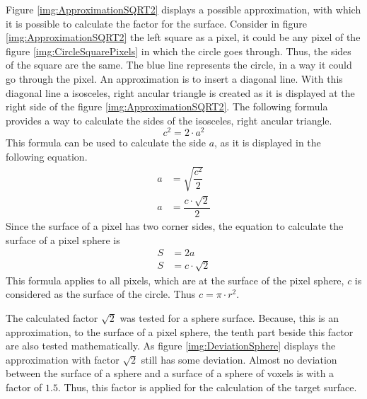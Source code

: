 Figure \ref{img:ApproximationSQRT2} displays a possible approximation, with which it is possible to calculate the factor for the surface. \newline
Consider in figure \ref{img:ApproximationSQRT2} the left square as a pixel, it could be any pixel of the figure \ref{img:CircleSquarePixels} in which the circle goes through. Thus, the sides of the square are the same. The blue line represents the circle, in a way it could go through the pixel. An approximation is to insert a diagonal line. With this diagonal line a isosceles, right ancular triangle is created as it is displayed at the right side of the figure \ref{img:ApproximationSQRT2}. \newline
The following formula provides a way to calculate the sides of the isosceles, right ancular triangle.
\begin{equation}\label{eq:IsoscelesRightAncularTriangle}
c^{2} = 2 \cdot a^{2}
\end{equation}
This formula can be used to calculate the side $a$, as it is displayed in the following equation.
\begin{equation}\label{eq:CornerSideAOfTriangle}
\begin{split}
a &= \sqrt{\dfrac{c^{2}}{2}} \\
a &= \dfrac{c \cdot \sqrt{2}}{2}
\end{split}
\end{equation}
Since the surface of a pixel has two corner sides, the equation to calculate the surface of a pixel sphere is
\begin{equation}\label{eq:PixelSurfaceCalculation}
\begin{split}
S &= 2a \\
S &= c \cdot \sqrt{2}
\end{split}
\end{equation}
This formula applies to all pixels, which are at the surface of the pixel sphere, $c$ is considered as the surface of the circle. Thus $c = \pi \cdot r^{2}$.

The calculated factor $\sqrt{2}$ was tested for a sphere surface. Because, this is an approximation, to the surface of a pixel sphere, the tenth part beside this factor are also tested mathematically. As figure \ref{img:DeviationSphere} displays the  approximation with factor $\sqrt{2}$ still has some deviation. Almost no deviation between the surface of a sphere and a surface of a sphere of voxels is with a factor of $1.5$. Thus, this factor is applied for the calculation of the target surface. 

